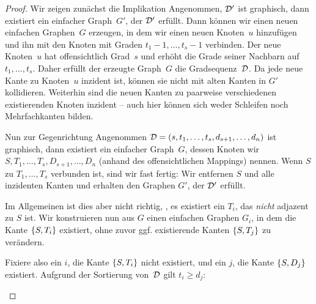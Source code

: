 \begin{proof}
    Wir  zeigen zunächst die Implikation 
    Angenommen, $\degseq'$ ist graphisch, dann existiert ein einfacher Graph~$G'$, der $\degseq'$ erfüllt.
    Dann können wir einen neuen einfachen Graphen~$G$ erzeugen, in dem wir einen neuen Knoten~$u$ hinzufügen und ihn mit den Knoten mit Graden $t_1{-}1, \ldots, t_s{-}1$ verbinden.
    Der neue Knoten~$u$ hat offensichtlich Grad~$s$ und erhöht die Grade seiner Nachbarn auf $t_1, \ldots, t_s$.
    Daher erfüllt der erzeugte Graph~$G$ die Gradsequenz~$\degseq$.
    Da jede neue Kante zu Knoten~$u$ inzident ist, können sie nicht mit alten Kanten in $G'$ kollidieren.
    Weiterhin sind die neuen Kanten zu paarweise verschiedenen existierenden Knoten inzident -- auch hier können sich weder Schleifen noch Mehrfachkanten bilden.

    Nun  zur Gegenrichtung 
    Angenommen $\degseq = (s, t_1, \ldots, t_s, d_{s+1}, \ldots, d_n)$ ist graphisch, dann existiert ein einfacher Graph~$G$, dessen Knoten wir $S, T_1, \ldots, T_s, D_{s+1}, \ldots, D_n$ (anhand des offensichtlichen Mappings) nennen.
    Wenn $S$ zu $T_1, \ldots, T_s$ verbunden ist, sind wir fast fertig: Wir entfernen $S$ und alle inzidenten Kanten und erhalten den Graphen $G'$, der $\degseq'$ erfüllt.

    Im Allgemeinen ist dies aber nicht richtig, \dh, es existiert ein $T_i$, das \emph{nicht} adjazent zu $S$ ist.
    Wir konstruieren nun aus $G$ einen einfachen Graphen $G_i$, in dem die Kante $\set{S, T_i}$ existiert, ohne zuvor ggf. existierende Kanten $\set{S, T_j}$ zu verändern.

    Fixiere also ein $i$, \sd die Kante $\set{S, T_i}$ nicht existiert, und ein $j$, \sd die Kante $\set{S, D_j}$ existiert.
    Aufgrund der Sortierung von~$\degseq$ gilt $t_i \ge d_j$:
    \begin{figure}
        \begin{center}
            \begin{tikzpicture}[
                    node distance=4em,
                    node/.style={draw, inner sep=0, minimum width=1.5em, minimum height=1.5em, circle},
                    edge/.style={draw, thick, black},
                    nonedge/.style={draw, dashed, red},
                ]


\end{tikzpicture}
\end{center}
\end{figure}
\end{proof}
